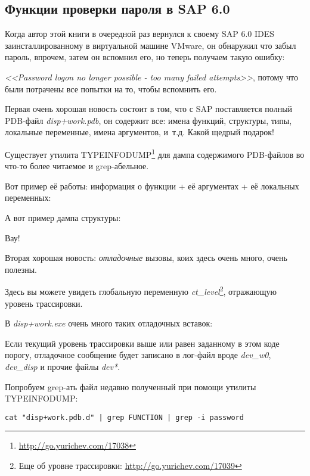 \subsection{Функции проверки пароля в SAP 6.0}

Когда автор этой книги в очередной раз вернулся к своему SAP 6.0 IDES заинсталлированному в виртуальной машине VMware, он обнаружил что забыл пароль, впрочем, затем он вспомнил его, но теперь получаем такую ошибку:
 
\emph{<<Password logon no longer possible - too many failed attempts>>}, 
потому что были потрачены все попытки на то, чтобы вспомнить его.

Первая очень хорошая новость состоит в том, что с SAP поставляется полный \gls{PDB}-файл \emph{disp+work.pdb}, он содержит все: имена функций, структуры, типы, локальные переменные, имена аргументов, и~т.д. Какой щедрый подарок!

Существует утилита TYPEINFODUMP\footnote{\url{http://go.yurichev.com/17038}} для дампа содержимого \gls{PDB}-файлов во что-то более читаемое и grep-абельное.

Вот пример её работы: информация о функции + её аргументах + её локальных переменных:



А вот пример дампа структуры:



Вау!

Вторая хорошая новость: \emph{отладочные} вызовы, коих здесь очень много, очень полезны. 

Здесь вы можете увидеть глобальную переменную \emph{ct\_level}\footnote{Еще об уровне трассировки: \url{http://go.yurichev.com/17039}}, отражающую уровень трассировки.

В \emph{disp+work.exe} очень много таких отладочных вставок:



Если текущий уровень трассировки выше или равен заданному в этом коде порогу, 
отладочное сообщение будет записано в лог-файл вроде \emph{dev\_w0}, \emph{dev\_disp} 
и прочие файлы \emph{dev*}.

\myindex{\GrepUsage}
Попробуем grep-ать файл недавно полученный при помощи утилиты TYPEINFODUMP:

\begin{lstlisting}
cat "disp+work.pdb.d" | grep FUNCTION | grep -i password
\end{lstlisting}

